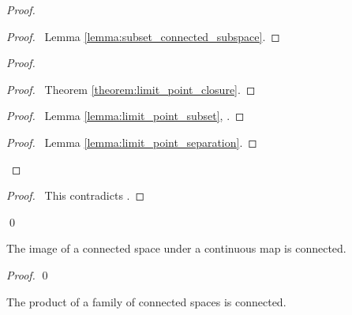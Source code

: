 \begin{proof}
    \pf
    \begin{proof}
        \pf\ Lemma \ref{lemma:subset_connected_subspace}.
    \end{proof}
    \begin{proof}
        \begin{proof}
            \pf\ Theorem \ref{theorem:limit_point_closure}.
        \end{proof}
        \begin{proof}
            \pf\ Lemma \ref{lemma:limit_point_subset}, .
        \end{proof}
        \begin{proof}
            \pf\ Lemma \ref{lemma:limit_point_separation}.
        \end{proof}
    \end{proof}
    \qedstep
    \begin{proof}
        \pf\ This contradicts .
    \end{proof}
    \qed
\end{proof}

\begin{theorem}
    \label{theorem:connected_continuous_image}
    The image of a connected space under a continuous map is connected.
\end{theorem}

\begin{proof}
    \pf
    \qed
\end{proof}

\begin{theorem}
    The product of a family of connected spaces is connected.
\end{theorem}

